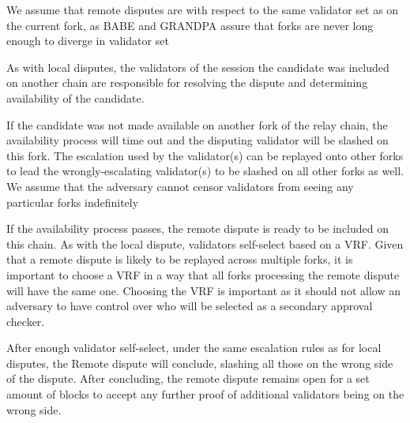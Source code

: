 We assume that remote disputes are with respect to the same validator set as on
the current fork, as BABE and GRANDPA assure that forks are never long enough to
diverge in validator set 
\newline

As with local disputes, the validators of the session the candidate was included
on another chain are responsible for resolving the dispute and determining
availability of the candidate.
\newline

If the candidate was not made available on another fork of the relay chain, the
availability process will time out and the disputing validator will be slashed
on this fork. The escalation used by the validator(s) can be replayed onto other
forks to lead the wrongly-escalating validator(s) to be slashed on all other
forks as well. We assume that the adversary cannot censor validators from seeing
any particular forks indefinitely 
\newline

If the availability process passes, the remote dispute is ready to be included
on this chain. As with the local dispute, validators self-select based on a VRF.
Given that a remote dispute is likely to be replayed across multiple forks, it
is important to choose a VRF in a way that all forks processing the remote
dispute will have the same one. Choosing the VRF is important as it should not
allow an adversary to have control over who will be selected as a secondary
approval checker.
\newline

After enough validator self-select, under the same escalation rules as for local
disputes, the Remote dispute will conclude, slashing all those on the wrong side
of the dispute. After concluding, the remote dispute remains open for a set
amount of blocks to accept any further proof of additional validators being on
the wrong side.
